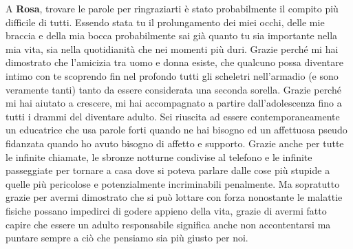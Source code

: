 \documentclass[cucitura%
,12pt%
]{toptesi}
\begin{document}
A \textbf{Rosa}, trovare le parole per ringraziarti è stato probabilmente il compito più difficile di tutti. Essendo stata tu il prolungamento dei miei occhi, delle mie braccia e della mia bocca probabilmente sai già quanto tu sia importante nella mia vita, sia nella quotidianità che nei momenti più duri. 
Grazie perché mi hai dimostrato che l’amicizia tra uomo e donna esiste, che qualcuno possa diventare intimo con te  scoprendo fin nel profondo tutti gli scheletri nell’armadio (e sono veramente tanti) tanto da essere considerata una seconda sorella. 
Grazie perché mi hai aiutato a crescere, mi hai accompagnato a partire dall’adolescenza fino a tutti i drammi del diventare adulto. Sei riuscita ad essere contemporaneamente un educatrice che usa parole forti quando ne hai bisogno ed un affettuosa pseudo fidanzata quando ho avuto bisogno di affetto e supporto.
Grazie anche per tutte le infinite chiamate, le sbronze notturne condivise al telefono e le infinite passeggiate per tornare a casa dove si poteva parlare dalle cose più stupide a quelle più pericolose e potenzialmente incriminabili penalmente. Ma sopratutto grazie per avermi dimostrato che si può lottare con 
forza nonostante le malattie fisiche possano impedirci di godere appieno della vita, grazie di avermi fatto capire che essere un adulto responsabile significa anche non accontentarsi ma puntare sempre a ciò che pensiamo sia più giusto per noi. 





%

%
%
\end{document}
